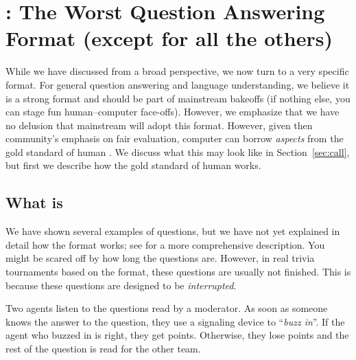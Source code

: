 

\section{\qb{}: The Worst Question Answering Format (except for all the others)}
\label{sec:qb}

While we have discussed \qa{} from a broad perspective, we now turn to a very specific format.
For general question answering and language understanding, we believe it is a strong format and should be part of mainstream  bakeoffs (if nothing else, you can stage fun human--computer face-offs).
However, we emphasize that we have no delusion that mainstream  will adopt this format.
However, given then community's emphasis on fair evaluation, computer  can borrow \emph{aspects} from the gold standard of human .
We discuss what this may look like in Section~\ref{sec:call}, but first we describe how the gold standard of human  works.

\subsection{What is \qb{}}

We have shown several examples of \qb{} questions, but we have not yet explained in detail how the format works; see  for a more comprehensive description.
You might be scared off by how long the questions are.
However, in real trivia tournaments based on the \qb{} format, these questions are usually not finished.
This is because these questions are designed to be \emph{interrupted}.

Two agents listen to the questions read by a moderator.
As soon as someone knows the answer to the question, they use a signaling device to ``\emph{buzz in}''. 
If the agent who buzzed in is right, they get points.
Otherwise, they lose points and the rest of the question is read for the other team.  

